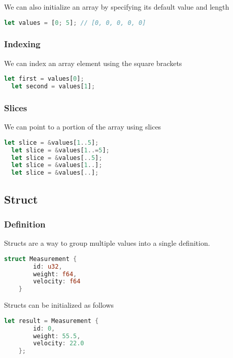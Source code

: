 \documentclass[a4paper]{article}
\begin{document}
We can also initialize an array by specifying its default value and length

\begin{lstlisting}[language=Rust, style=boxed, numbers=none]
  let values = [0; 5]; // [0, 0, 0, 0, 0]
\end{lstlisting}

\subsubsection{Indexing}

We can index an array element using the square brackets

\begin{lstlisting}[language=Rust, style=boxed, numbers=none]
  let first = values[0];
  let second = values[1];
\end{lstlisting}

\subsubsection{Slices}

We can point to a portion of the array using slices

\begin{lstlisting}[language=Rust, style=boxed, numbers=none]
  let slice = &values[1..5];
  let slice = &values[1..=5];
  let slice = &values[..5];
  let slice = &values[1..];
  let slice = &values[..];
\end{lstlisting}

\subsection{Struct}

\subsubsection{Definition}

Structs are a way to group multiple values
into a single definition.

\begin{lstlisting}[language=Rust, style=boxed, numbers=none]
    struct Measurement {
        id: u32,
        weight: f64,
        velocity: f64
    }
\end{lstlisting}

Structs can be initialized as follows

\begin{lstlisting}[language=Rust, style=boxed, numbers=none]
    let result = Measurement {
        id: 0,
        weight: 55.5,
        velocity: 22.0
    };
\end{lstlisting}
\end{document}
